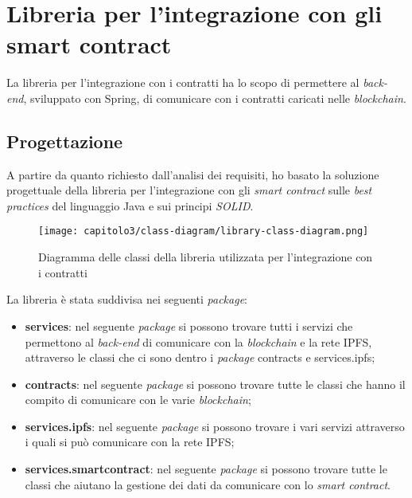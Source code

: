 
\section{Libreria per l'integrazione con gli smart contract}
La libreria per l'integrazione con i contratti ha lo scopo di permettere al \textit{back-end}, sviluppato con Spring, di comunicare con i contratti caricati nelle \textit{blockchain}.

\subsection{Progettazione}
A partire da quanto richiesto dall'analisi dei requisiti, ho basato la soluzione progettuale della libreria per l'integrazione con gli \textit{smart contract} sulle \textit{best practices} del linguaggio Java e sui principi \textit{SOLID}.

\begin{figure}[h!]
  \centering
  \texttt{[image: capitolo3/class-diagram/library-class-diagram.png]}
  \caption{Diagramma delle classi della libreria utilizzata per l'integrazione con i contratti}
\end{figure}

\noindent La libreria è stata suddivisa nei seguenti \textit{package}:
\begin{itemize}
  \item \textbf{services}: nel seguente \textit{package} si possono trovare tutti i servizi che permettono al \textit{back-end} di comunicare con la \textit{blockchain} e la rete IPFS, attraverso le classi che ci sono dentro i \textit{package} contracts e services.ipfs;

  \item \textbf{contracts}: nel seguente \textit{package} si possono trovare tutte le classi che hanno il compito di comunicare con le varie \textit{blockchain};

  \item \textbf{services.ipfs}: nel seguente \textit{package} si possono trovare i vari servizi attraverso i quali si può comunicare con la rete IPFS;
  
  \item \textbf{services.smartcontract}: nel seguente \textit{package} si possono trovare tutte le classi che aiutano la gestione dei dati da comunicare con lo \textit{smart contract}.
\end{itemize}

